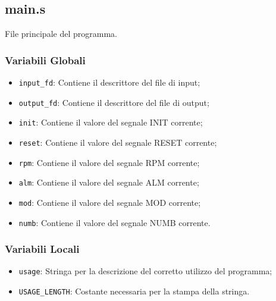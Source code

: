 \documentclass[a4paper,11pt]{article}
\begin{document}
	\subsection{main.s}
	File principale del programma. 
		\subsubsection{Variabili Globali}
		\begin{itemize}
			\item \texttt{input\_fd}: Contiene il descrittore del file di input;
			\item \texttt{output\_fd}: Contiene il descrittore del file di output;
			\item \texttt{init}: Contiene il valore del segnale INIT corrente;
			\item \texttt{reset}: Contiene il valore del segnale RESET corrente;
			\item \texttt{rpm}: Contiene il valore del segnale RPM corrente;
			\item \texttt{alm}: Contiene il valore del segnale ALM corrente;
			\item \texttt{mod}: Contiene il valore del segnale MOD corrente;
			\item \texttt{numb}: Contiene il valore del segnale NUMB corrente.
		\end{itemize}
		\subsubsection{Variabili Locali}
	\begin{itemize}
		\item \texttt{usage}: Stringa per la descrizione del corretto utilizzo del programma;
		\item \texttt{USAGE\_LENGTH}: Costante necessaria per la stampa della stringa.
	\end{itemize}
\end{document}
